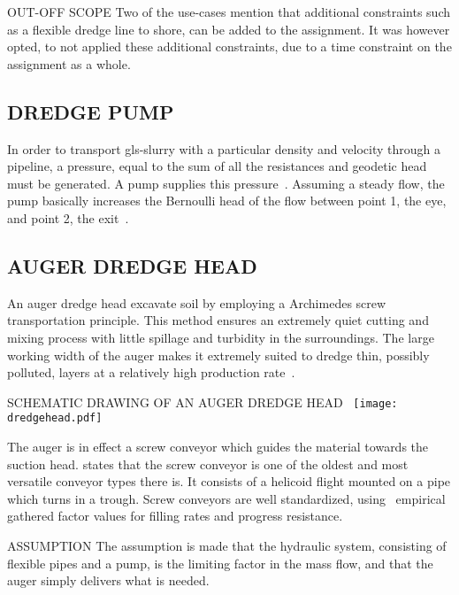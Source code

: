 \begin{RoyalNote}{OUT-OFF SCOPE}
  Two of the use-cases mention that additional constraints such as a flexible dredge line to shore, can be added to the
  assignment. It was however opted, to not applied these additional constraints, due to a time constraint on the
  assignment as a whole.
\end{RoyalNote}

\subsection{DREDGE PUMP}
In order to transport \gls{gls-slurry} with a particular density and velocity through a pipeline, a pressure, equal to
the sum of all the resistances and geodetic head must be generated. A pump supplies this
pressure~\cite{van_den_berg_ihc_2013}. Assuming a steady flow, the pump basically increases the Bernoulli head of the
flow between point 1, the eye, and point 2, the exit~\cite{white_fluid_2011}.

\subsection{AUGER DREDGE HEAD}
An auger dredge head excavate soil by employing a Archimedes screw transportation principle. This method ensures an
extremely quiet cutting and mixing process with little spillage and turbidity in the surroundings. The large working
width of the auger makes it extremely suited to dredge thin, possibly polluted, layers at a relatively high production
rate~\cite{van_der_schrieck_dredging_2014}.

\begin{RoyalFigure}[htb, label=fig:dredge_head]{SCHEMATIC DRAWING OF AN AUGER DREDGE HEAD~\cite{wetering_ihc_mti_crawler_dredger_final_report_2018} }
  \texttt{[image: dredgehead.pdf]}
\end{RoyalFigure}

The auger is in effect a screw conveyor which guides the material towards the suction head. \citet{perry_2007} states
that the screw conveyor is one of the oldest and most versatile conveyor types there is. It consists of a helicoid
flight mounted on a pipe which turns in a trough. Screw conveyors are well standardized,
using~\citet{international_standard_iso_neniso_1981} empirical gathered factor values for filling rates and progress
resistance.

\begin{RoyalNote}[label=assumption_dredge_speed]{ASSUMPTION}
	The assumption is made that the hydraulic system, consisting of flexible pipes and a pump, is the limiting factor in the
	mass flow, and that the auger simply delivers what is needed.
\end{RoyalNote}

